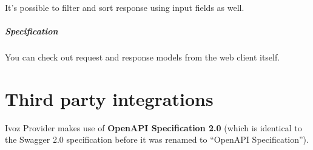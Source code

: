 \documentclass[letterpaper,10pt,english]{sphinxmanual}
\begin{document}
It's possible to filter and sort response using  input fields as well.
\paragraph{Specification}

You can check out request and response models from the web client itself.



\chapter{Third party integrations}
\label{api_rest/integrations:third-party-integrations}\label{api_rest/integrations::doc}
Ivoz Provider makes use of \textbf{OpenAPI Specification 2.0} (which is identical to the Swagger 2.0 specification before it was
renamed to ``OpenAPI Specification'').
\end{document}
